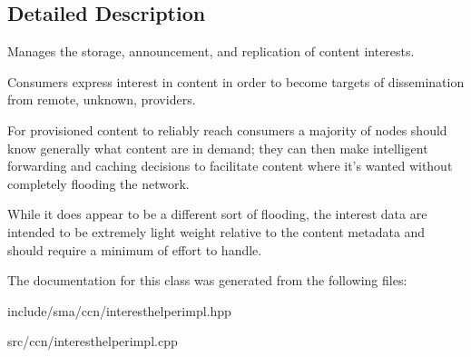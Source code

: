 \subsection{Detailed Description}
Manages the storage, announcement, and replication of content interests. 

Consumers express interest in content in order to become targets of dissemination from remote, unknown, providers.

For provisioned content to reliably reach consumers a majority of nodes should know generally what content are in demand; they can then make intelligent forwarding and caching decisions to facilitate content where it's wanted without completely flooding the network.

While it does appear to be a different sort of flooding, the interest data are intended to be extremely light weight relative to the content metadata and should require a minimum of effort to handle. 

The documentation for this class was generated from the following files\-:\begin{DoxyCompactItemize}
\item 
include/sma/ccn/interesthelperimpl.\-hpp\item 
src/ccn/interesthelperimpl.\-cpp\end{DoxyCompactItemize}
